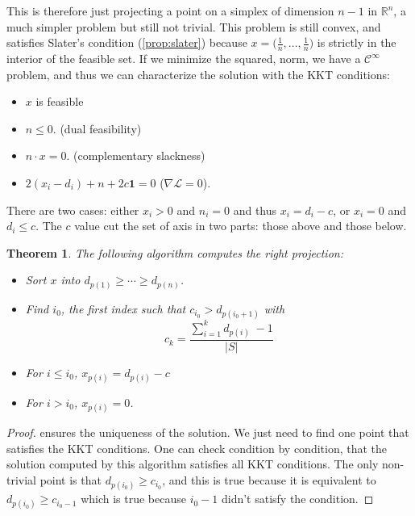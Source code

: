 \documentclass[10pt,a4paper]{report}
\theoremstyle{plain}
\newtheorem{thm}{Theorem}[chapter]
\theoremstyle{definition}
\theoremstyle{remark}
\newcommand{\R}{\ensuremath{\mathbb{R}}}
\renewcommand{\geq}{\geqslant}
\renewcommand{\leq}{\leqslant}
\newcommand{\class}[1]{{\mathscr{C}^{#1}}}
\begin{document}
This is therefore just projecting a point on a simplex of dimension $n-1$ in
$\R^n$, a much simpler problem but still not trivial. This problem is still
convex, and satisfies Slater's condition (\ref{prop:slater}) because $x = \big(\frac1n,\ldots,\frac1n\big)$
is strictly in the interior of the feasible set. If we minimize the squared,
norm, we have a $\class \infty$ problem, and thus we can characterize the
solution with the KKT conditions:
\begin{itemize}
\item $x$ is feasible
\item $n \leq 0$. (dual feasibility)
\item $n \cdot x = 0$. (complementary slackness)
\item $\displaystyle 2(x_i-d_i) + n + 2c \mathbf 1 = 0$ ($\nabla \mathcal{L} = 0$).
\end{itemize}

There are two cases: either $x_i > 0$ and $n_i = 0$ and thus $x_i = d_i - c$, or
$x_i = 0$ and $d_i \leq c$. The $c$ value cut the set of axis in two parts: those above
and those below.

\begin{thm}
  The following algorithm computes the right projection:
\begin{itemize}
\item Sort $x$ into $d_{p(1)} \geq \cdots \geq d_{p(n)}$.
\item Find $i_0$, the first index such that $c_{i_0} > d_{p(i_0+1)}$ with
  \[c_k = \frac{\sum\limits_{i = 1}^{k}\! d_{p(i)}\; -1}{|S|}\]
\item For $i \leq i_0$, $x_{p(i)} = d_{p(i)} - c$
\item For $i > i_0$, $x_{p(i)} = 0$.
\end{itemize}
\end{thm}

\begin{proof}
   ensures the uniqueness of the solution. We just need to
  find one point that satisfies the KKT conditions. One can check condition by
  condition, that the solution computed by this algorithm satisfies all KKT
  conditions. The only non-trivial point is that $d_{p(i_0)} \geq c_{i_0}$, and
  this is true because it is equivalent to $d_{p(i_0)} \geq c_{i_0 -1}$ which is
  true because $i_0 -1$ didn't satisfy the condition.
\end{proof}
\end{document}
